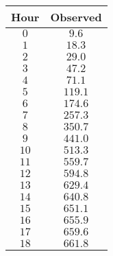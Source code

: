 \begin{tabular}{cc} \toprule
Hour  & Observed \\\midrule
$0$   & $9.6$    \\
$1$   & $18.3$   \\
$2$   & $29.0$   \\
$3$   & $47.2$   \\
$4$   & $71.1$   \\
$5$   & $119.1$  \\
$6$   & $174.6$  \\
$7$   & $257.3$  \\
$8$   & $350.7$  \\
$9$   & $441.0$  \\
$10$  & $513.3$  \\
$11$  & $559.7$  \\
$12$  & $594.8$  \\
$13$  & $629.4$  \\
$14$  & $640.8$  \\
$15$  & $651.1$  \\
$16$  & $655.9$  \\
$17$  & $659.6$  \\
$18$  & $661.8$  \\\bottomrule
\end{tabular}
